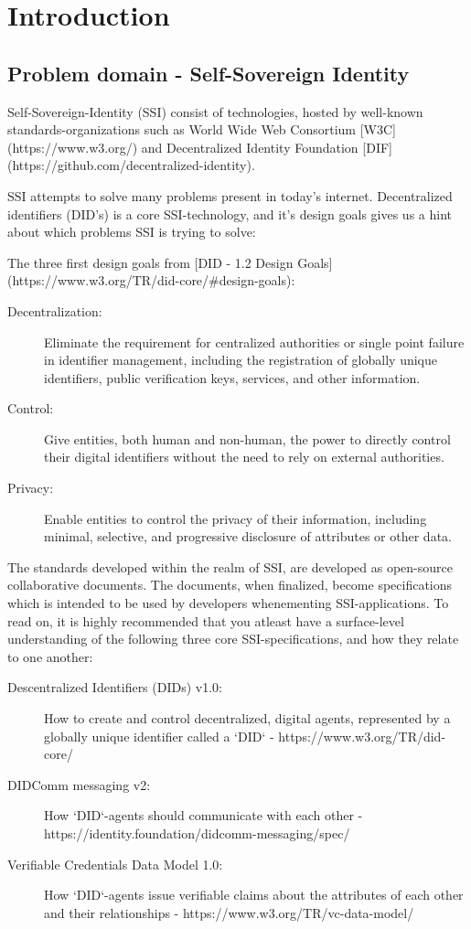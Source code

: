 \chapter{Introduction}
\section{Problem domain - Self-Sovereign Identity}

Self-Sovereign-Identity (SSI) consist of technologies, hosted by well-known standards-organizations such as World Wide Web Consortium [W3C](https://www.w3.org/) and Decentralized Identity Foundation [DIF](https://github.com/decentralized-identity).

SSI attempts to solve many problems present in today's internet. Decentralized identifiers (DID's) is a core SSI-technology, and it's design goals gives us a hint about which problems SSI is trying to solve:

The three first design goals from [DID - 1.2 Design Goals](https://www.w3.org/TR/did-core/\#design-goals): 
\begin{description}
    \item[Decentralization:] Eliminate the requirement for centralized authorities or single point failure in identifier management, including the registration of globally unique identifiers, public verification keys, services, and other information.
    \item[Control:] Give entities, both human and non-human, the power to directly control their digital identifiers without the need to rely on external authorities.
    \item [Privacy:] Enable entities to control the privacy of their information, including minimal, selective, and progressive disclosure of attributes or other data.
\end{description}

The standards developed within the realm of SSI, are developed as open-source collaborative documents. The documents, when finalized, become specifications which is intended to be used by developers whenementing SSI-applications. To read on, it is highly recommended that you atleast have a surface-level understanding of the following three core SSI-specifications, and how they relate to one another: 
\begin{description}
    \item [Descentralized Identifiers (DIDs) v1.0:] How to create and control decentralized, digital agents, represented by a globally unique identifier called a `DID` - https://www.w3.org/TR/did-core/
    \item [DIDComm messaging v2:] How `DID`-agents should communicate with each other - https://identity.foundation/didcomm-messaging/spec/ 
    \item [Verifiable Credentials Data Model 1.0:] How `DID`-agents issue verifiable claims about the attributes of each other and their relationships - https://www.w3.org/TR/vc-data-model/ 
\end{description}

